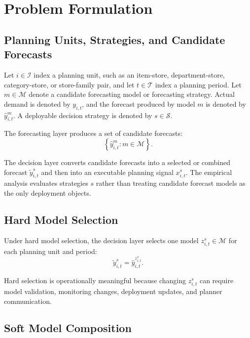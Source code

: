 \section{Problem Formulation}

\subsection{Planning Units, Strategies, and Candidate Forecasts}

Let $i \in \mathcal{I}$ index a planning unit, such as an item-store, department-store, category-store, or store-family pair, and let $t \in \mathcal{T}$ index a planning period. Let $m \in \mathcal{M}$ denote a candidate forecasting model or forecasting strategy. Actual demand is denoted by $y_{i,t}$, and the forecast produced by model $m$ is denoted by $\hat{y}_{i,t}^{m}$. A deployable decision strategy is denoted by $s \in \mathcal{S}$.

The forecasting layer produces a set of candidate forecasts:
\begin{equation}
    \left\{\hat{y}_{i,t}^{m}: m \in \mathcal{M}\right\}.
\end{equation}

The decision layer converts candidate forecasts into a selected or combined forecast $\tilde{y}_{i,t}^{s}$ and then into an executable planning signal $x_{i,t}^{s}$. The empirical analysis evaluates strategies $s$ rather than treating candidate forecast models as the only deployment objects.

\subsection{Hard Model Selection}

Under hard model selection, the decision layer selects one model $z_{i,t}^{s} \in \mathcal{M}$ for each planning unit and period:
\begin{equation}
    \tilde{y}_{i,t}^{s} = \hat{y}_{i,t}^{z_{i,t}^{s}}.
\end{equation}

Hard selection is operationally meaningful because changing $z_{i,t}^{s}$ can require model validation, monitoring changes, deployment updates, and planner communication.

\subsection{Soft Model Composition}

